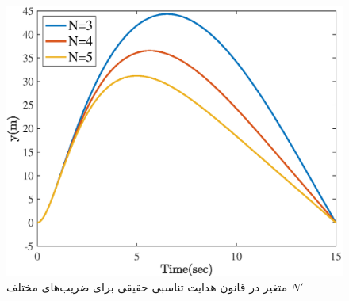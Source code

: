 \begin{figure}[H]
	\centering
	\includegraphics[width=.75\linewidth]{../Figure/Q2/a/y}
	\caption{متغیر  در قانون هدایت تناسبی حقیقی برای ضریب‌های مختلف
		$N'$}
\end{figure}
